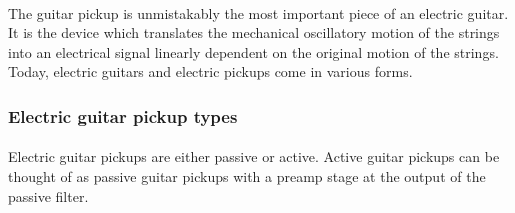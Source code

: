 \documentclass{article}
\begin{document}
\paragraph*{}
The guitar pickup is unmistakably the most important piece of an electric
guitar. It is the device which translates the mechanical oscillatory motion of
the strings into an electrical signal linearly dependent on the original motion
of the strings. Today, electric guitars and electric pickups come in various 
forms.

\subsubsection{Electric guitar pickup types}

\paragraph*{}
Electric guitar pickups are either passive or active. Active guitar pickups can
be thought of as passive guitar pickups with a preamp stage at the output of
the passive filter.
\end{document}

